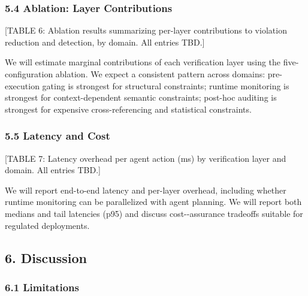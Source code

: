 \documentclass[
]{article}
\begin{document}
\hypertarget{54-ablation-layer-contributions}{%
\subsubsection{5.4 Ablation: Layer Contributions}\label{54-ablation-layer-contributions}}

{[}TABLE 6: Ablation results summarizing per-layer contributions to violation reduction and detection, by domain. All entries TBD.{]}

We will estimate marginal contributions of each verification layer using the five-configuration ablation. We expect a consistent pattern across domains: pre-execution gating is strongest for structural constraints; runtime monitoring is strongest for context-dependent semantic constraints; post-hoc auditing is strongest for expensive cross-referencing and statistical constraints.

\hypertarget{55-latency-and-cost}{%
\subsubsection{5.5 Latency and Cost}\label{55-latency-and-cost}}

{[}TABLE 7: Latency overhead per agent action (ms) by verification layer and domain. All entries TBD.{]}

We will report end-to-end latency and per-layer overhead, including whether runtime monitoring can be parallelized with agent planning. We will report both medians and tail latencies (p95) and discuss cost-\/-assurance tradeoffs suitable for regulated deployments.

\hypertarget{6-discussion}{%
\subsection{6. Discussion}\label{6-discussion}}

\hypertarget{61-limitations}{%
\subsubsection{6.1 Limitations}\label{61-limitations}}
\end{document}
